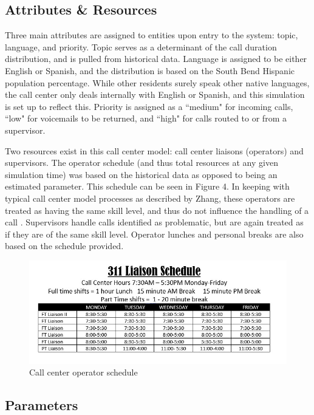 \documentclass[12pt,twocolumn]{article}
\begin{document}
	\subsection{Attributes \& Resources}

Three main attributes are assigned to entities upon entry to the system:  topic, language, and priority.  Topic serves as a determinant of the call duration distribution, and is pulled from historical data.  Language is assigned to be either English or Spanish, and the distribution is based on the South Bend Hispanic population percentage.  While other residents surely speak other native languages, the call center only deals internally with English or Spanish, and this simulation is set up to reflect this.  Priority is assigned as a ``medium" for incoming calls, ``low" for voicemails to be returned, and ``high" for calls routed to or from a supervisor.

\par

Two resources exist in this call center model:  call center liaisons (operators) and supervisors.  The operator schedule (and thus total resources at any given simulation time) was based on the historical data as opposed to being an estimated parameter.  This schedule can be seen in Figure 4.  In keeping with typical call center model processes as described by Zhang, these operators are treated as having the same skill level, and thus do not influence the handling of a call \cite{zhang}.  Supervisors handle calls identified as problematic, but are again treated as if they are of the same skill level.  Operator lunches and personal breaks are also based on the schedule provided.

	\begin{figure}[h]
		\includegraphics[scale=.3]{schedule2.jpg}
		\caption{Call center operator schedule}
	\end{figure}
	
	\subsection{Parameters}
	
\end{document}
